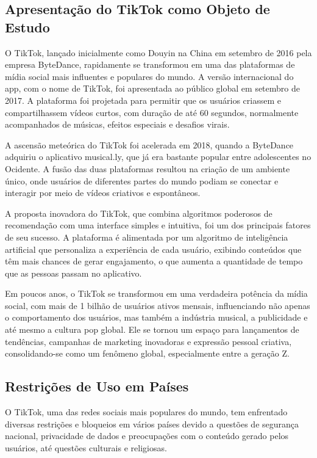 \newpage
\subsection{Apresentação do TikTok como Objeto de Estudo}

O TikTok, lançado inicialmente como Douyin na China em setembro de 2016 pela empresa ByteDance, rapidamente se transformou em uma das plataformas de mídia social mais influentes e populares do mundo. A versão internacional do app, com o nome de TikTok, foi apresentada ao público global em setembro de 2017. A plataforma foi projetada para permitir que os usuários criassem e compartilhassem vídeos curtos, com duração de até 60 segundos, normalmente acompanhados de músicas, efeitos especiais e desafios virais.\vskip0.3cm

A ascensão meteórica do TikTok foi acelerada em 2018, quando a ByteDance adquiriu o aplicativo musical.ly, que já era bastante popular entre adolescentes no Ocidente. A fusão das duas plataformas resultou na criação de um ambiente único, onde usuários de diferentes partes do mundo podiam se conectar e interagir por meio de vídeos criativos e espontâneos.\vskip0.3cm

A proposta inovadora do TikTok, que combina algoritmos poderosos de recomendação com uma interface simples e intuitiva, foi um dos principais fatores de seu sucesso. A plataforma é alimentada por um algoritmo de inteligência artificial que personaliza a experiência de cada usuário, exibindo conteúdos que têm mais chances de gerar engajamento, o que aumenta a quantidade de tempo que as pessoas passam no aplicativo.\vskip0.3cm

Em poucos anos, o TikTok se transformou em uma verdadeira potência da mídia social, com mais de 1 bilhão de usuários ativos mensais, influenciando não apenas o comportamento dos usuários, mas também a indústria musical, a publicidade e até mesmo a cultura pop global. Ele se tornou um espaço para lançamentos de tendências, campanhas de marketing inovadoras e expressão pessoal criativa, consolidando-se como um fenômeno global, especialmente entre a geração Z.\vskip0.3cm

\newpage
\subsection{Restrições de Uso em Países}

O TikTok, uma das redes sociais mais populares do mundo, tem enfrentado diversas restrições e bloqueios em vários países devido a questões de segurança nacional, privacidade de dados e preocupações com o conteúdo gerado pelos usuários, até questões culturais e religiosas.\vskip0.3cm


